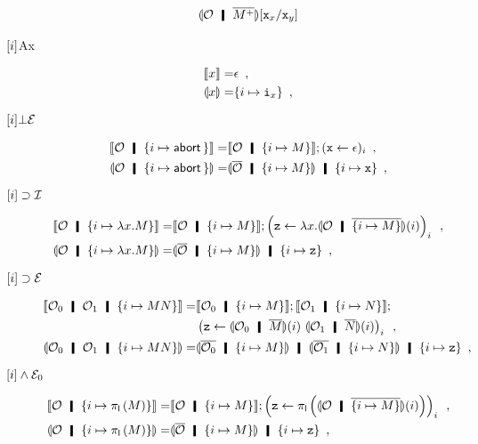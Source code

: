 \begin{description}
\begin{align*}
       \semoi{{\hypert}\hmid \overline{\m{M}}}[\p x_x/ \p x_y]
      \end{align*}
 \item[$\lbrack {i}\rbrack$Ax]
      \begin{align*}
       \llbracket{x}\rrbracket=& \epsilon \enspace,\\
       \llparenthesis{x}\rrparenthesis=& \{i\mapsto \texttt{i}_x\}\enspace,
      \end{align*}
 \item[${\lbrack {i}\rbrack}\bot\mathcal E$]
      \begin{align*}
       \semo{\hypert\hmid\{i\mapsto\abort\}}
       =&\semo{\hypert\hmid\{i\mapsto M\}} ; (\p x\leftarrow \epsilon)_i\enspace,\\
       \semoi{\hypert\hmid\{i\mapsto\abort\}}
       =&\semoi{\overline{\hypert}\hmid\{i\mapsto M\}} \hmid \{i\mapsto
       \p x\}\enspace,
      \end{align*}
 \item[$\lbrack {i}\rbrack\supset\mathcal I$]
\begin{align*}
 \semo{\hypert\hmid \{i\mapsto \lambda x.M\}}=
 & \semo{\hypert\hmid \imapsto{M}}; \left(\p z\leftarrow
 \lambda x. \semoi{\hypert\hmid\overline{\imapsto{M}}}(i)\right)_i \enspace,\\
 \semoi{\hypert\hmid \imapsto{\lambda x.M}} =& \semoi{\overline\hypert\hmid
 \imapsto{M}} \hmid \{i\mapsto \p z\}\enspace,
\end{align*}
 \item[$\lbrack {i}\rbrack\supset\mathcal E$]
\begin{align*}
 \semo{\hypert_0\hmid\hypert_1\hmid \imapsto{MN}}=&
 \semo{\hypert_0\hmid \imapsto{M}};
 \semo{\hypert_1\hmid \imapsto{N}};\\&
 \left(\p z\leftarrow \semoi{\hypert_0\hmid \overline{
 M}}(i)\,\,\semoi{\hypert_1\hmid \overline N}(i)\right)_i\enspace,\\
 \semoi{\hypert_0\hmid\hypert_1\hmid \imapsto{MN}} =&
 \semoi{\overline{\hypert_0}\hmid \imapsto{M}} \hmid
 \semoi{\overline{\hypert_1}\hmid \imapsto{N}}
 \hmid \{i\mapsto \p z\}\enspace,
\end{align*}
 \item[$\lbrack {i}\rbrack\wedge\mathcal E_0$]
\begin{align*}
 \semo{\hypert\hmid \imapsto{\lpil M}} =& \semo{\hypert\hmid \imapsto{M}};
 \left(\p z \leftarrow
 \lpil {\semoi{\hypert\hmid\overline{\imapsto{M}}}(i)}\right)_i\enspace, \\
 \semoi{\hypert\hmid \imapsto{\lpil M}}=& \semoi{\overline \hypert\hmid
 \imapsto{M}}\hmid \{{i\mapsto \p z}\}\enspace,

\end{align*}
\end{description}
